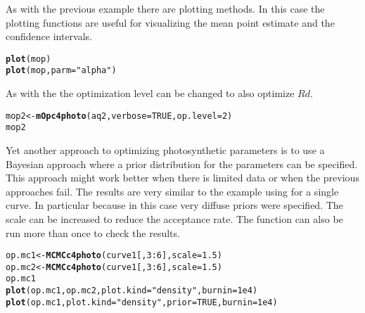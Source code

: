 \documentclass[12pt]{article}\usepackage[]{graphicx}\usepackage[]{color}
\makeatletter
\newcommand{\hlnum}[1]{\textcolor[rgb]{0.686,0.059,0.569}{#1}}%
\newcommand{\hlstr}[1]{\textcolor[rgb]{0.192,0.494,0.8}{#1}}%
\newcommand{\hlopt}[1]{\textcolor[rgb]{0,0,0}{#1}}%
\newcommand{\hlstd}[1]{\textcolor[rgb]{0.345,0.345,0.345}{#1}}%
\newcommand{\hlkwb}[1]{\textcolor[rgb]{0.69,0.353,0.396}{#1}}%
\newcommand{\hlkwc}[1]{\textcolor[rgb]{0.333,0.667,0.333}{#1}}%
\newcommand{\hlkwd}[1]{\textcolor[rgb]{0.737,0.353,0.396}{\textbf{#1}}}%
\newenvironment{kframe}{%
 \def\at@end@of@kframe{}%
 \ifinner\ifhmode%
  \def\at@end@of@kframe{\end{minipage}}%
  \begin{minipage}{\columnwidth}%
 \fi\fi%
 \def\FrameCommand##1{\hskip\@totalleftmargin \hskip-\fboxsep
 \colorbox{shadecolor}{##1}\hskip-\fboxsep
     \hskip-\linewidth \hskip-\@totalleftmargin \hskip\columnwidth}%
 \MakeFramed {\advance\hsize-\width
   \@totalleftmargin\z@ \linewidth\hsize
   \@setminipage}}%
 {\par\unskip\endMakeFramed%
 \at@end@of@kframe}
\newenvironment{knitrout}{}{} %
\makeatother
\begin{document}
As with the previous example there are plotting methods. In this case the
plotting functions are useful for visualizing the mean point estimate and the
confidence intervals. 

\begin{knitrout}
\color{fgcolor}\begin{kframe}
\begin{alltt}
\hlkwd{plot}\hlstd{(mop)}
\hlkwd{plot}\hlstd{(mop,} \hlkwc{parm}\hlstd{=}\hlstr{"alpha"}\hlstd{)}
\end{alltt}
\end{kframe}
\end{knitrout}

As with the  the optimization level can be changed to also
optimize $Rd$.

\begin{knitrout}
\color{fgcolor}\begin{kframe}
\begin{alltt}
\hlstd{mop2} \hlkwb{<-} \hlkwd{mOpc4photo}\hlstd{(aq2,} \hlkwc{verbose}\hlstd{=}\hlnum{TRUE}\hlstd{,} \hlkwc{op.level}\hlstd{=}\hlnum{2}\hlstd{)}
\hlstd{mop2}
\end{alltt}
\end{kframe}
\end{knitrout}

Yet another approach to optimizing photosynthetic parameters is to use a
Bayesian approach where a prior distribution for the parameters can be
specified. This approach might work better when there is limited data or when
the previous approaches fail. The results are very similar to the example using
 for a single curve. In particular because in this case very
diffuse priors were specified. The scale can be increased to reduce the
acceptance rate. The function can also be run more than once to check the
results.

\begin{knitrout}
\color{fgcolor}\begin{kframe}
\begin{alltt}
\hlstd{op.mc1} \hlkwb{<-} \hlkwd{MCMCc4photo}\hlstd{(curve1[,}\hlnum{3}\hlopt{:}\hlnum{6}\hlstd{],} \hlkwc{scale}\hlstd{=}\hlnum{1.5}\hlstd{)}
\hlstd{op.mc2} \hlkwb{<-} \hlkwd{MCMCc4photo}\hlstd{(curve1[,}\hlnum{3}\hlopt{:}\hlnum{6}\hlstd{],} \hlkwc{scale}\hlstd{=}\hlnum{1.5}\hlstd{)}
\hlstd{op.mc1}
\hlkwd{plot}\hlstd{(op.mc1, op.mc2,} \hlkwc{plot.kind}\hlstd{=}\hlstr{"density"}\hlstd{,} \hlkwc{burnin}\hlstd{=}\hlnum{1e4}\hlstd{)}
\hlkwd{plot}\hlstd{(op.mc1,} \hlkwc{plot.kind}\hlstd{=}\hlstr{"density"}\hlstd{,} \hlkwc{prior}\hlstd{=}\hlnum{TRUE}\hlstd{,} \hlkwc{burnin}\hlstd{=}\hlnum{1e4}\hlstd{)}
\end{alltt}
\end{kframe}
\end{knitrout}
\end{document}
